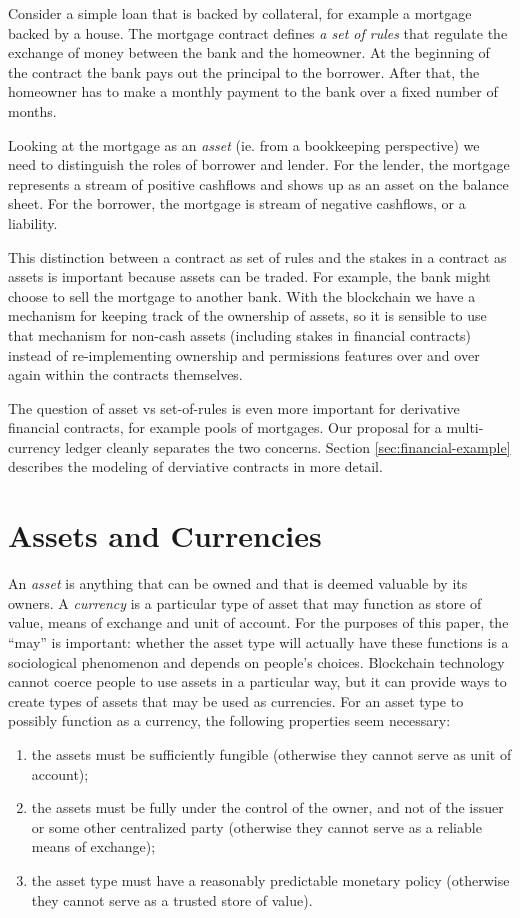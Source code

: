 \documentclass{llncs}
\begin{document}
Consider a simple loan that is backed by collateral, for example a mortgage backed by a house. The mortgage contract defines \emph{a set of rules} that regulate the exchange of money between the bank and the homeowner. At the beginning of the contract the bank pays out the principal to the borrower. After that, the homeowner has to make a monthly payment to the bank over a fixed number of months. 

Looking at the mortgage as an \emph{asset} (ie. from a bookkeeping perspective) we need to distinguish the roles of borrower and lender. For the lender, the mortgage represents a stream of positive cashflows and shows up as an asset on the balance sheet. For the borrower, the mortgage is stream of negative cashflows, or a liability. 

This distinction between a contract as set of rules and the stakes in a contract as assets is important because assets can be traded. For example, the bank might choose to sell the mortgage to another bank. With the blockchain we have a mechanism for keeping track of the ownership of assets, so it is sensible to use that mechanism for non-cash assets (including stakes in financial contracts) instead of re-implementing ownership and permissions features over and over again within the contracts themselves.

The question of asset vs set-of-rules is even more important for derivative financial contracts, for example pools of mortgages. Our proposal for a multi-currency ledger cleanly separates the two concerns. Section \ref{sec:financial-example} describes the modeling of derviative contracts in more detail.

\section{Assets and Currencies}
\label{sec:Preliminaries}

An \emph{asset} is anything that can be owned and that is deemed valuable by its owners. A \emph{currency} is a particular type of asset that may function as store of value, means of exchange and unit of account. For the purposes of this paper, the ``may'' is important: whether the asset type will actually have these functions is a sociological phenomenon and depends on people's choices. Blockchain technology cannot coerce people to use assets in a particular way, but it can provide ways to create types of assets that may be used as currencies. For an asset type to possibly function as a currency, the following properties seem necessary:
\begin{enumerate}
\item the assets must be sufficiently fungible (otherwise they cannot serve as unit of account);
\item the assets must be fully under the control of the owner, and not of the issuer or some other centralized party (otherwise they cannot serve as a reliable means of exchange);
\item the asset type must have a reasonably predictable monetary policy (otherwise they cannot serve as a trusted store of value).
\end{enumerate}
\end{document}
